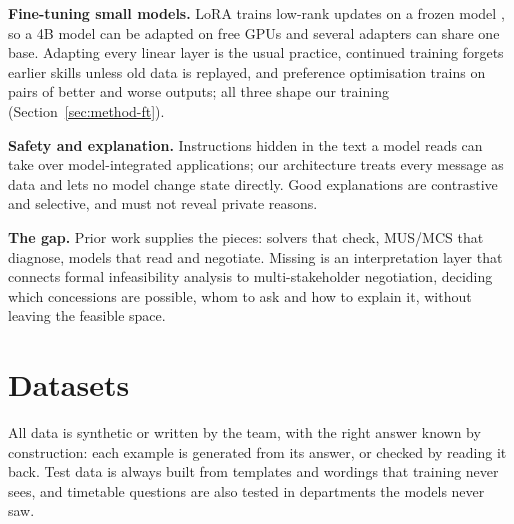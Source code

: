 \documentclass[11pt,a4paper]{article}
\begin{document}
\textbf{Fine-tuning small models.} LoRA trains low-rank updates on a frozen model \cite{hu2022}, so a 4B model can be
adapted on free GPUs and several adapters can share one base. Adapting every linear layer is the usual practice,
continued training forgets earlier skills unless old data is replayed, and preference optimisation trains on pairs of
better and worse outputs; all three shape our training (Section~\ref{sec:method-ft}).

\textbf{Safety and explanation.} Instructions hidden in the text a model reads can take over model-integrated
applications; our architecture treats every message as data and lets no model change state directly. Good
explanations are contrastive and selective, and must not reveal private reasons.

\textbf{The gap.} Prior work supplies the pieces: solvers that check, MUS/MCS that diagnose, models that read and
negotiate. Missing is an interpretation layer that connects formal infeasibility analysis to multi-stakeholder
negotiation, deciding which concessions are possible, whom to ask and how to explain it, without leaving the
feasible space.

\section{Datasets}
\label{sec:data}
All data is synthetic or written by the team, with the right answer known by construction: each example is generated
from its answer, or checked by reading it back. Test data is always built from templates and wordings that training
never sees, and timetable questions are also tested in departments the models never saw.
\end{document}
